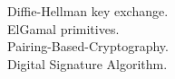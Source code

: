 \documentclass[preview]{standalone}
\begin{document}
Diffie-Hellman key exchange.\\ElGamal primitives.\\Pairing-Based-Cryptography.\\Digital Signature Algorithm.\\
\end{document}
